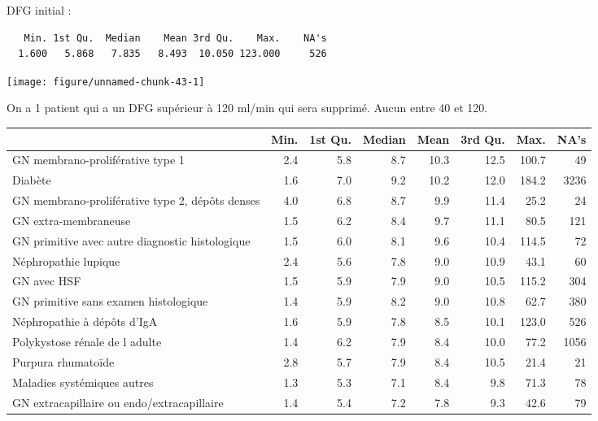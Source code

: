 \documentclass[11pt,a4paper]{article}\usepackage[]{graphicx}\usepackage[]{color}
\makeatletter
\def\maxwidth{ %
  \ifdim\Gin@nat@width>\linewidth
    \linewidth
  \else
    \Gin@nat@width
  \fi
}
\newenvironment{kframe}{%
 \def\at@end@of@kframe{}%
 \ifinner\ifhmode%
  \def\at@end@of@kframe{\end{minipage}}%
  \begin{minipage}{\columnwidth}%
 \fi\fi%
 \def\FrameCommand##1{\hskip\@totalleftmargin \hskip-\fboxsep
 \colorbox{shadecolor}{##1}\hskip-\fboxsep
     \hskip-\linewidth \hskip-\@totalleftmargin \hskip\columnwidth}%
 \MakeFramed {\advance\hsize-\width
   \@totalleftmargin\z@ \linewidth\hsize
   \@setminipage}}%
 {\par\unskip\endMakeFramed%
 \at@end@of@kframe}
\newenvironment{knitrout}{}{} %
\makeatother
\begin{document}
DFG initial :


\begin{knitrout}
\color{fgcolor}\begin{kframe}
\begin{verbatim}
   Min. 1st Qu.  Median    Mean 3rd Qu.    Max.    NA's 
  1.600   5.868   7.835   8.493  10.050 123.000     526 
\end{verbatim}
\end{kframe}
\texttt{[image: figure/unnamed-chunk-43-1]} 

\end{knitrout}
On a 1 patient qui a un DFG supérieur à 120 ml/min qui sera supprimé. Aucun entre 40 et 120.

\begin{table}[H]
\centering
\begingroup\small
\begin{tabular}{lrrrrrrr}
  \hline
 & Min. & 1st Qu. & Median & Mean & 3rd Qu. & Max. & NA's \\ 
  \hline
GN membrano-proliférative type 1 & 2.4 & 5.8 & 8.7 & 10.3 & 12.5 & 100.7 & 49 \\ 
  Diabète & 1.6 & 7.0 & 9.2 & 10.2 & 12.0 & 184.2 & 3236 \\ 
  GN membrano-proliférative type 2, dépôts denses & 4.0 & 6.8 & 8.7 & 9.9 & 11.4 & 25.2 & 24 \\ 
  GN extra-membraneuse & 1.5 & 6.2 & 8.4 & 9.7 & 11.1 & 80.5 & 121 \\ 
  GN primitive avec autre diagnostic histologique & 1.5 & 6.0 & 8.1 & 9.6 & 10.4 & 114.5 & 72 \\ 
  Néphropathie lupique & 2.4 & 5.6 & 7.8 & 9.0 & 10.9 & 43.1 & 60 \\ 
  GN avec HSF & 1.5 & 5.9 & 7.9 & 9.0 & 10.5 & 115.2 & 304 \\ 
  GN primitive sans examen histologique & 1.4 & 5.9 & 8.2 & 9.0 & 10.8 & 62.7 & 380 \\ 
  Néphropathie à dépôts d'IgA & 1.6 & 5.9 & 7.8 & 8.5 & 10.1 & 123.0 & 526 \\ 
  Polykystose rénale de l adulte & 1.4 & 6.2 & 7.9 & 8.4 & 10.0 & 77.2 & 1056 \\ 
  Purpura rhumatoïde & 2.8 & 5.7 & 7.9 & 8.4 & 10.5 & 21.4 & 21 \\ 
  Maladies systémiques autres & 1.3 & 5.3 & 7.1 & 8.4 & 9.8 & 71.3 & 78 \\ 
  GN extracapillaire ou endo/extracapillaire & 1.4 & 5.4 & 7.2 & 7.8 & 9.3 & 42.6 & 79 \\ 
   \hline
\end{tabular}
\endgroup
\end{table}
\end{document}
